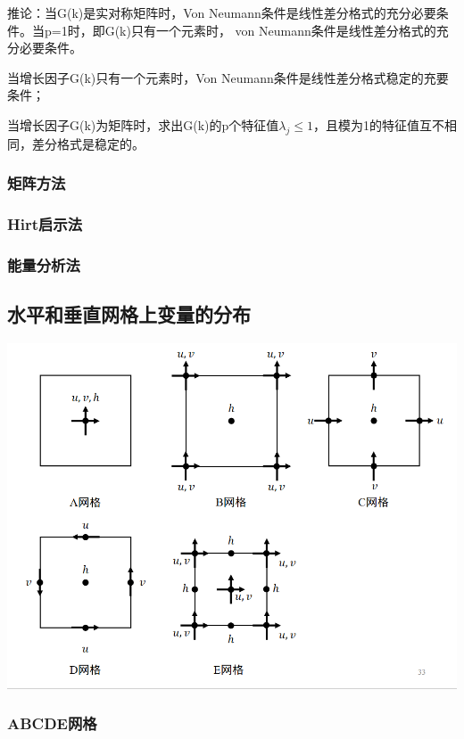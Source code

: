 \documentclass{article}
\begin{document}
推论：当G(k)是实对称矩阵时，Von Neumann条件是线性差分格式的充分必要条件。当p=1时，即G(k)只有一个元素时， von Neumann条件是线性差分格式的充分必要条件。

当增长因子G(k)只有一个元素时，Von Neumann条件是线性差分格式稳定的充要条件；

当增长因子G(k)为矩阵时，求出G(k)的p个特征值$\lambda_j\le 1$，且模为1的特征值互不相同，差分格式是稳定的。

\subsubsection{矩阵方法}
\subsubsection{Hirt启示法}
\subsubsection{能量分析法}

\subsection{水平和垂直网格上变量的分布}
\begin{center}
        \includegraphics[width=\linewidth]{Fig3_3.png}
\end{center}

\subsubsection{ABCDE网格}
\end{document}
